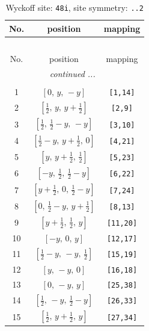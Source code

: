 \documentclass[fleqn,8pt]{jsarticle}
\begin{document}
\renewcommand{\arraystretch}{1.2}
\begin{longtable}{ccc}
\caption{Wyckoff site: {\tt 48i}, site symmetry: {\tt ..2}}
 \\
 \hline \hline
No. & position & mapping \\ \hline \endfirsthead

\multicolumn{2}{l}{\tablename\ \thetable{}} \\
 \hline \hline
No. & position & mapping \\ \hline \endhead

 \hline \hline
\multicolumn{2}{r}{\footnotesize\it continued ...} \\ \endfoot

 \hline \hline
\multicolumn{2}{r}{} \\ \endlastfoot

1 & $\left[ 0,\, y,\, - y \right]$ & {\tt [1,14]} \\ \hline
2 & $\left[ \frac{1}{2},\, y,\, y + \frac{1}{2} \right]$ & {\tt [2,9]} \\ \hline
3 & $\left[ \frac{1}{2},\, \frac{1}{2} - y,\, - y \right]$ & {\tt [3,10]} \\ \hline
4 & $\left[ \frac{1}{2} - y,\, y + \frac{1}{2},\, 0 \right]$ & {\tt [4,21]} \\ \hline
5 & $\left[ y,\, y + \frac{1}{2},\, \frac{1}{2} \right]$ & {\tt [5,23]} \\ \hline
6 & $\left[ - y,\, \frac{1}{2},\, \frac{1}{2} - y \right]$ & {\tt [6,22]} \\ \hline
7 & $\left[ y + \frac{1}{2},\, 0,\, \frac{1}{2} - y \right]$ & {\tt [7,24]} \\ \hline
8 & $\left[ 0,\, \frac{1}{2} - y,\, y + \frac{1}{2} \right]$ & {\tt [8,13]} \\ \hline
9 & $\left[ y + \frac{1}{2},\, \frac{1}{2},\, y \right]$ & {\tt [11,20]} \\ \hline
10 & $\left[ - y,\, 0,\, y \right]$ & {\tt [12,17]} \\ \hline
11 & $\left[ \frac{1}{2} - y,\, - y,\, \frac{1}{2} \right]$ & {\tt [15,19]} \\ \hline
12 & $\left[ y,\, - y,\, 0 \right]$ & {\tt [16,18]} \\ \hline
13 & $\left[ 0,\, - y,\, y \right]$ & {\tt [25,38]} \\ \hline
14 & $\left[ \frac{1}{2},\, - y,\, \frac{1}{2} - y \right]$ & {\tt [26,33]} \\ \hline
15 & $\left[ \frac{1}{2},\, y + \frac{1}{2},\, y \right]$ & {\tt [27,34]} \\ \hline

\end{longtable}
\end{document}
